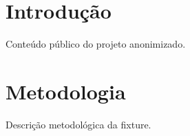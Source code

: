 \documentclass{abntexto-ufc}
\begin{document}
\pretextual

\imprimircapa
\imprimirfolhaderosto
{}
\imprimirsumario

\textual
\section{Introdução}
Conteúdo público do projeto anonimizado.

\section{Metodologia}
Descrição metodológica da fixture.
\end{document}
